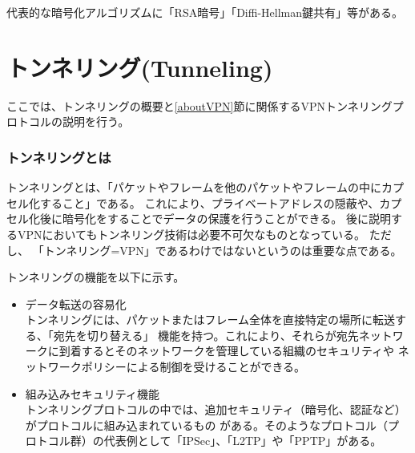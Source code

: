 \documentclass[12pt,a4paper,titlepage]{jreport}
\begin{document}
代表的な暗号化アルゴリズムに「RSA暗号」「Diffi-Hellman鍵共有」等がある。



\section{トンネリング(Tunneling)}\label{Tunnel}
ここでは、トンネリングの概要と\ref{aboutVPN}節に関係するVPNトンネリングプロトコルの説明を行う。

\subsubsection*{トンネリングとは}

トンネリングとは、「パケットやフレームを他のパケットやフレームの中にカプセル化すること」である。
これにより、プライベートアドレスの隠蔽や、カプセル化後に暗号化をすることでデータの保護を行うことができる。
後に説明するVPNにおいてもトンネリング技術は必要不可欠なものとなっている。
ただし、
「トンネリング=VPN」であるわけではないというのは重要な点である。

\par トンネリングの機能を以下に示す。
\begin{itemize}
    \item データ転送の容易化 \mbox{}\\
    トンネリングには、パケットまたはフレーム全体を直接特定の場所に転送する、「宛先を切り替える」
    機能を持つ。これにより、それらが宛先ネットワークに到着するとそのネットワークを管理している組織のセキュリティや
    ネットワークポリシーによる制御を受けることができる。
    \item 組み込みセキュリティ機能\mbox{}\\
    トンネリングプロトコルの中では、追加セキュリティ（暗号化、認証など）がプロトコルに組み込まれているもの
    がある。そのようなプロトコル（プロトコル群）の代表例として「IPSec」、「L2TP」や「PPTP」がある。
\end{itemize}
\end{document}
